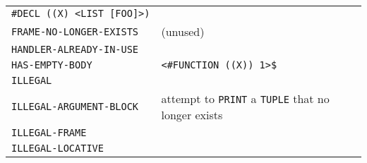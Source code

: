 \documentclass[a4paper]{scrbook}
\begin{document}
\begin{longtable}[]{@{}ll@{}}
\begin{minipage}[t]{0.36\columnwidth}
\texttt{\#DECL\ ((X)\ \textless{}LIST\ {[}FOO{]}\textgreater{})}\strut
\end{minipage}\tabularnewline
\begin{minipage}[t]{0.58\columnwidth}\raggedright\strut
\texttt{FRAME-NO-LONGER-EXISTS}\strut
\end{minipage} & \begin{minipage}[t]{0.36\columnwidth}\raggedright\strut
(unused)\strut
\end{minipage}\tabularnewline
\begin{minipage}[t]{0.58\columnwidth}\raggedright\strut
\texttt{HANDLER-ALREADY-IN-USE}\strut
\end{minipage} & \begin{minipage}[t]{0.36\columnwidth}\raggedright\strut
\strut
\end{minipage}\tabularnewline
\begin{minipage}[t]{0.58\columnwidth}\raggedright\strut
\texttt{HAS-EMPTY-BODY}\strut
\end{minipage} & \begin{minipage}[t]{0.36\columnwidth}\raggedright\strut
\texttt{\textless{}\#FUNCTION\ ((X))\ 1\textgreater{}\$}\strut
\end{minipage}\tabularnewline
\begin{minipage}[t]{0.58\columnwidth}\raggedright\strut
\texttt{ILLEGAL}\strut
\end{minipage} & \begin{minipage}[t]{0.36\columnwidth}\raggedright\strut
\strut
\end{minipage}\tabularnewline
\begin{minipage}[t]{0.58\columnwidth}\raggedright\strut
\texttt{ILLEGAL-ARGUMENT-BLOCK}\strut
\end{minipage} & \begin{minipage}[t]{0.36\columnwidth}\raggedright\strut
attempt to \texttt{PRINT} a \texttt{TUPLE} that no longer exists\strut
\end{minipage}\tabularnewline
\begin{minipage}[t]{0.58\columnwidth}\raggedright\strut
\texttt{ILLEGAL-FRAME}\strut
\end{minipage} & \begin{minipage}[t]{0.36\columnwidth}\raggedright\strut
\strut
\end{minipage}\tabularnewline
\begin{minipage}[t]{0.58\columnwidth}\raggedright\strut
\texttt{ILLEGAL-LOCATIVE}\strut
\end{minipage} & \begin{minipage}[t]{0.36\columnwidth}\raggedright\strut

\end{minipage}
\end{longtable}
\end{document}
